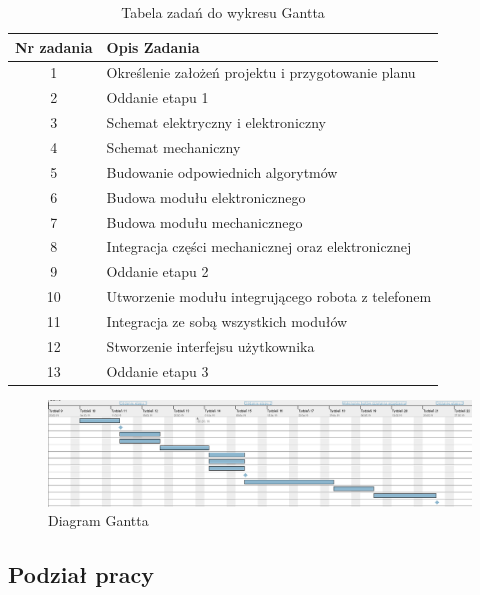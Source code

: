 \documentclass[10pt, a4paper]{article}
\begin{document}
\begin{table}[H]
	\centering
\begin{tabular}{|c|l|}
\hline
Nr zadania & Opis Zadania                                       \\ \hline
1          & Określenie założeń projektu i przygotowanie planu  \\ \hline
2          & Oddanie etapu 1                                    \\ \hline
3          & Schemat elektryczny i elektroniczny                \\ \hline
4          & Schemat mechaniczny                                \\ \hline
5          & Budowanie odpowiednich algorytmów                  \\ \hline
6          & Budowa modułu elektronicznego                      \\ \hline
7          & Budowa modułu mechanicznego                        \\ \hline
8          & Integracja części mechanicznej oraz elektronicznej \\ \hline
9          & Oddanie etapu 2                                    \\ \hline
10         & Utworzenie modułu integrującego robota z telefonem \\ \hline
11         & Integracja ze sobą wszystkich modułów              \\ \hline
12         & Stworzenie interfejsu użytkownika                  \\ \hline
13         & Oddanie etapu 3                                    \\ \hline
\end{tabular}
	\caption{Tabela zadań do wykresu Gantta}
\end{table}
\newpage
\begin{figure}[H]
	\centering
	\includegraphics[width=1.1\textwidth]{figures/gant.png}
	\caption{Diagram Gantta}
	\label{fig:DiagramGantta}
\end{figure}

\subsection{Podział pracy}
\end{document}

